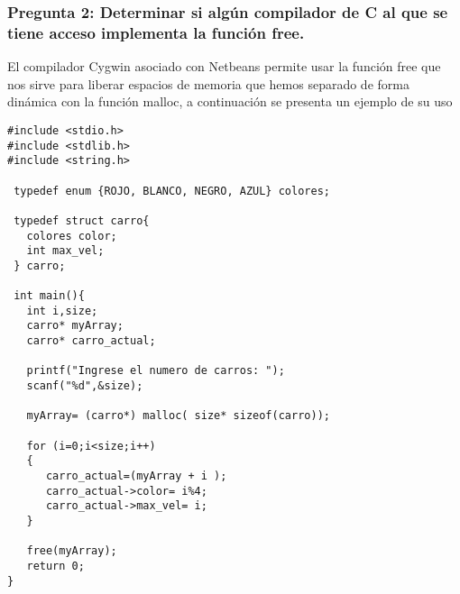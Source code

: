 \subsubsection{Pregunta 2: Determinar si algún compilador de C al que se tiene acceso implementa la función free.}

El compilador Cygwin asociado con Netbeans permite usar la función free que nos sirve para liberar espacios de memoria que hemos separado de forma dinámica con la función malloc, a continuación se presenta un ejemplo de su uso\\

\lstset{language = C} 
\begin{lstlisting}[frame = single] %Comienzo del Código
#include <stdio.h>
#include <stdlib.h>
#include <string.h>

 typedef enum {ROJO, BLANCO, NEGRO, AZUL} colores;
 
 typedef struct carro{
   colores color;
   int max_vel;
 } carro;
 
 int main(){
   int i,size;
   carro* myArray;
   carro* carro_actual; 
   
   printf("Ingrese el numero de carros: ");
   scanf("%d",&size);
   
   myArray= (carro*) malloc( size* sizeof(carro));

   for (i=0;i<size;i++)
   {
      carro_actual=(myArray + i );
      carro_actual->color= i%4;
      carro_actual->max_vel= i;
   }
   
   free(myArray);
   return 0;
}

\end{lstlisting}






